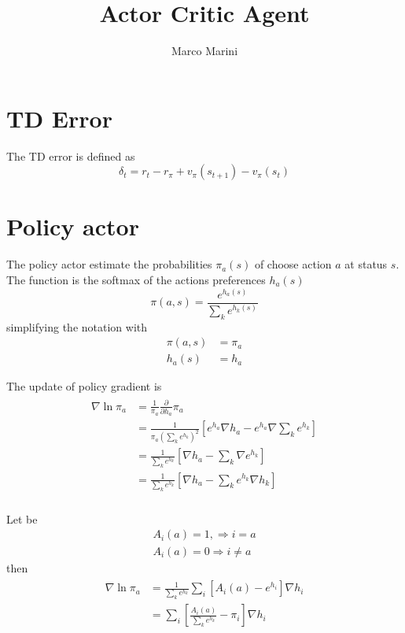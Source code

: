 \documentclass[]{article}
\title{Actor Critic Agent}
\author{Marco Marini}
\begin{document}
\maketitle

\begin{abstract}

\end{abstract}

\section{TD Error}

The TD error is defined as
\begin{equation}
\delta_t = r_t - r_\pi + v_\pi(s_{t+1}) - v_\pi(s_t)	
\end{equation}

\section{Policy actor}

The policy actor estimate the probabilities $ \pi_a(s) $ of choose action $ a $ at status $ s $.
The function is the softmax of the actions preferences $ h_a(s) $
\begin{equation}
	\pi(a, s) = \frac{e^{h_a(s)}}{\sum_k e^{h_k(s)}}
\end{equation}
simplifying the notation with
\begin{align*}
	\pi(a, s) & = \pi_a
	\\
	h_a(s) & = h_a
\end{align*}

The update of policy gradient is
\begin{align*}
\begin{split}
	\nabla \ln \pi_a& = \frac{1}{\pi_a}
	\frac{\partial}{\partial h_a} \pi_a
	\\
	& = \frac{1}{\pi_a ( \sum_k e^{h_k} )^2}
	\left[
		e^{h_a} \nabla h_a - e^{h_a} \nabla \sum_k e^{h_k}
	\right]
	\\
	& = \frac{1} { \sum_k e^{h_k}}
	\left[
		\nabla h_a - \sum_k \nabla e^{h_k}
	\right]
	\\
	& = \frac{1} { \sum_k e^{h_k}}
	\left[
		\nabla h_a - \sum_k e^{h_k} \nabla h_k
	\right]
	\\
\end{split}
\end{align*}

Let be
\begin{align*}
	A_i(a) = 1, \Rightarrow i = a 
	\\
	A_i(a) = 0 \Rightarrow i \ne a 
\end{align*}
then
\begin{align*}
\begin{split}
	\nabla \ln \pi_a& = \frac{1}{\sum_k e^{h_k}} \sum_i
	\left[
		A_i(a) - e^{h_i} 
	\right] \nabla h_i
	\\
	& = \sum_i
	\left[ \frac{ A_i(a)}{\sum_k e^{h_k}} - \pi_i
	\right] \nabla h_i
\end{split}
\end{align*}
\end{document}
